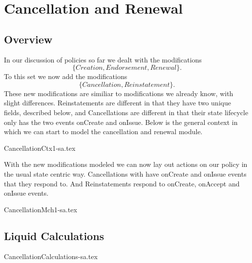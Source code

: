%
%
%
\chapter{Cancellation and Renewal}
\label{intro} %


\section{Overview}
\label{sec:02:1}
In our discussion of policies so far we dealt with the modifications
\begin{equation*}
  \{Creation, Endorsement, Renewal\}.
\end{equation*}
To this set we now
add the modifications
\begin{equation*}
  \{Cancellation, Reinstatement\}.
\end{equation*}
These new modifications are similiar to modifications we already
know, with slight differences. Reinstatements are different in that they have two unique fields, described below, and Cancellations
are different in that their state lifecycle only has the two events onCreate and onIssue. Below is the general context in which
we can start to model the cancellation and renewal module.

{CancellationCtx1-sa.tex}

With the new modifications modeled we can now lay out actions on our policy in the usual state centric way. Cancellations with have
onCreate and onIssue events that they respond to. And Reinstatements respond to onCreate, onAccept and onIssue events. 

{CancellationMch1-sa.tex}

\section{Liquid Calculations}
\label{sec:02:2}

{CancellationCalculations-sa.tex}
